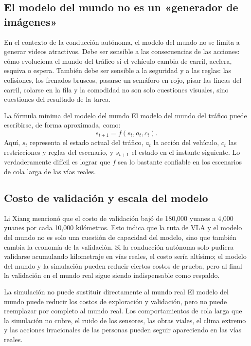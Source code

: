 \documentclass[a4paper]{article}
\begin{document}
\subsection{El modelo del mundo no es un «generador de imágenes»}

En el contexto de la conducción autónoma, el modelo del mundo no se limita a generar videos atractivos. Debe ser sensible a las consecuencias de las acciones: cómo evoluciona el mundo del tráfico si el vehículo cambia de carril, acelera, esquiva o espera. También debe ser sensible a la seguridad y a las reglas: las colisiones, los frenados bruscos, pasarse un semáforo en rojo, pisar las líneas del carril, colarse en la fila y la comodidad no son solo cuestiones visuales, sino cuestiones del resultado de la tarea.

\begin{importantbox}{La fórmula mínima del modelo del mundo}
El modelo del mundo del tráfico puede escribirse, de forma aproximada, como:
\[
s_{t+1} = f(s_t, a_t, c_t).
\]
Aquí, \(s_t\) representa el estado actual del tráfico, \(a_t\) la acción del vehículo, \(c_t\) las restricciones y reglas del escenario, y \(s_{t+1}\) el estado en el instante siguiente. Lo verdaderamente difícil es lograr que \(f\) sea lo bastante confiable en los escenarios de cola larga de las vías reales.
\end{importantbox}

\subsection{Costo de validación y escala del modelo}

Li Xiang mencionó que el costo de validación bajó de 180,000 yuanes a 4,000 yuanes por cada 10,000 kilómetros. Esto indica que la ruta de VLA y el modelo del mundo no es solo una cuestión de capacidad del modelo, sino que también cambia la economía de la validación. Si la conducción autónoma solo pudiera validarse acumulando kilometraje en vías reales, el costo sería altísimo; el modelo del mundo y la simulación pueden reducir ciertos costos de prueba, pero al final la validación en el mundo real sigue siendo indispensable como respaldo.

\begin{warningbox}{La simulación no puede sustituir directamente al mundo real}
El modelo del mundo puede reducir los costos de exploración y validación, pero no puede reemplazar por completo al mundo real. Los comportamientos de cola larga que la simulación no cubre, el ruido de los sensores, las obras viales, el clima extremo y las acciones irracionales de las personas pueden seguir apareciendo en las vías reales.
\end{warningbox}
\end{document}

